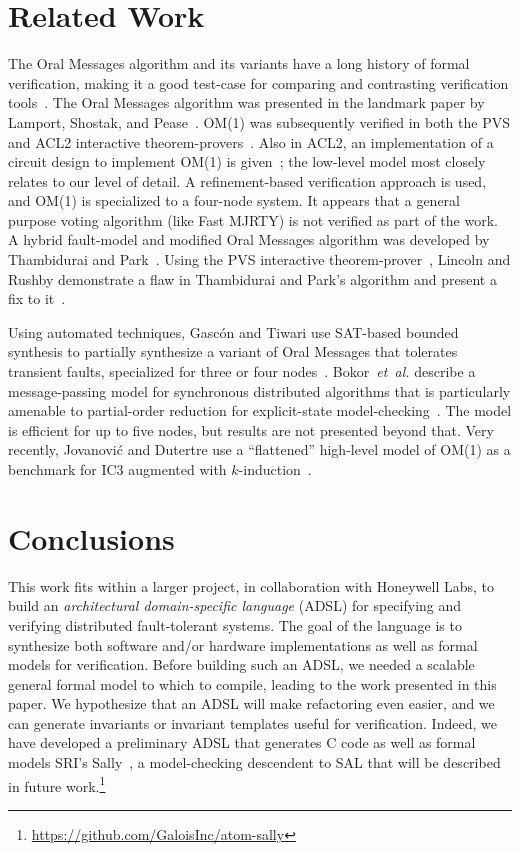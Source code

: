 \documentclass{llncs/llncs}
\begin{document}
\section{Related Work}\label{sec:related}

The Oral Messages algorithm and its variants have a long history of formal verification, making it a good test-case for comparing and contrasting verification tools~\cite{pvs}. The Oral Messages algorithm was presented in the landmark paper by Lamport, Shostak, and Pease~\cite{om}. OM(1) was subsequently verified in both the PVS and ACL2 interactive theorem-provers~\cite{Young97:IC}. Also in ACL2, an implementation of a circuit design to implement OM(1) is given~\cite{om-acl2-impl}; the low-level model most closely relates to our level of detail. A refinement-based verification approach is used, and OM(1) is specialized to a four-node system. It appears that a general purpose voting algorithm (like Fast MJRTY) is not verified as part of the work. A hybrid fault-model and modified Oral Messages algorithm was developed by Thambidurai and Park~\cite{hybrid}. Using the PVS interactive theorem-prover~\cite{pvs}, Lincoln and Rushby demonstrate a flaw in Thambidurai and Park's algorithm and present a fix to it~\cite{csl-93-2}.

Using automated techniques, Gasc{\'{o}}n and Tiwari use SAT-based bounded synthesis to partially synthesize a variant of Oral Messages that tolerates transient faults, specialized for three or four nodes~\cite{om1-synth}. Bokor~\emph{et~al.} describe a message-passing model for synchronous distributed algorithms that is particularly amenable to partial-order reduction for explicit-state model-checking~\cite{Bokor2010}. The model is efficient for up to five nodes, but results are not presented beyond that. Very recently, Jovanovi{\'{c}} and Dutertre use a ``flattened'' high-level model of OM(1) as a benchmark for IC3 augmented with $k$-induction~\cite{pdr-kind}.

\section{Conclusions}\label{sec:conclusions}
This work fits within a larger project, in collaboration with Honeywell Labs, to build an \emph{architectural domain-specific language} (ADSL) for specifying and verifying distributed fault-tolerant systems. The goal of the language is to synthesize both software and/or hardware implementations as well as formal models for verification. Before building such an ADSL, we needed a scalable general formal model to which to compile, leading to the work presented in this paper. We hypothesize that an ADSL will make refactoring even easier, and we can generate invariants or invariant templates useful for verification. Indeed, we have developed a preliminary ADSL that generates C code as well as formal models SRI's Sally~\cite{}, a model-checking descendent to SAL that will be described in future work.\footnote{\url{https://github.com/GaloisInc/atom-sally}}
\end{document}
